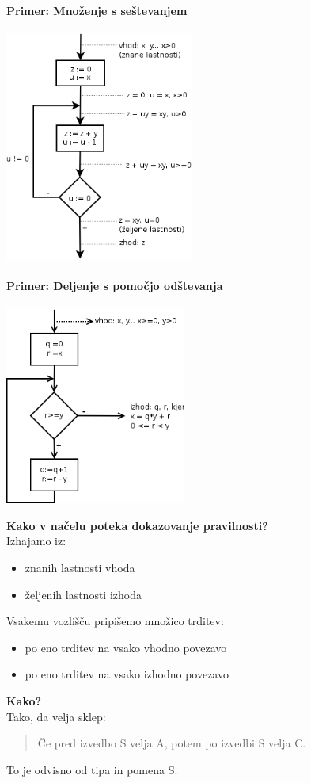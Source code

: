 \documentclass[a4paper,10pt]{article}
\begin{document}
\paragraph{Primer: Mno\v zenje s se\v stevanjem}
	\begin{center}
	\includegraphics[width=6.2cm,height=7.55cm]{Slike/MnozenjeSSestevanjem.png}
	\end{center}

\paragraph{Primer: Deljenje s pomo\v cjo od\v stevanja}
	\begin{center}
	\includegraphics[width=5.95cm,height=6.5cm]{Slike/DeljenjeZOdstevanjem.png}
	\end{center}
\textbf{Kako v na\v celu poteka dokazovanje pravilnosti?} \\
Izhajamo iz:
\begin{itemize}
\item znanih lastnosti vhoda
\item \v zeljenih lastnosti izhoda
\end{itemize}
Vsakemu vozli\v s\v cu pripi\v semo mno\v zico trditev:
\begin{itemize}
\item po eno trditev na vsako vhodno povezavo
\item po eno trditev na vsako izhodno povezavo
\end{itemize}
\textbf{Kako?}\\
Tako, da velja sklep:
\begin{quote}
\v Ce pred izvedbo S velja A, potem po izvedbi S velja C.
\end{quote}
To je odvisno od tipa in pomena S.
\end{document}
